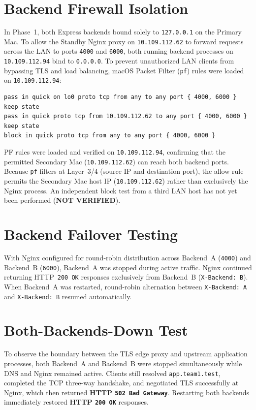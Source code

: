 \documentclass[conference]{IEEEtran}
\begin{document}
\section{Backend Firewall Isolation}
In Phase~1, both Express backends bound solely to \texttt{127.0.0.1} on the Primary Mac. To allow the Standby Nginx proxy on \texttt{10.109.112.62} to forward requests across the LAN to ports \texttt{4000} and \texttt{6000}, both running backend processes on \texttt{10.109.112.94} bind to \texttt{0.0.0.0}. To prevent unauthorized LAN clients from bypassing TLS and load balancing, macOS Packet Filter (\texttt{pf}) rules were loaded on \texttt{10.109.112.94}:

\begin{lstlisting}[caption={macOS PF Anchor Rules (\texttt{configs/pf/cn\_project.anchor.conf})}]
pass in quick on lo0 proto tcp from any to any port { 4000, 6000 } keep state
pass in quick proto tcp from 10.109.112.62 to any port { 4000, 6000 } keep state
block in quick proto tcp from any to any port { 4000, 6000 }
\end{lstlisting}

PF rules were loaded and verified on \texttt{10.109.112.94}, confirming that the permitted Secondary Mac (\texttt{10.109.112.62}) can reach both backend ports. Because \texttt{pf} filters at Layer~3/4 (source IP and destination port), the allow rule permits the Secondary Mac host IP (\texttt{10.109.112.62}) rather than exclusively the Nginx process. An independent block test from a third LAN host has not yet been performed (\textbf{NOT VERIFIED}).

\section{Backend Failover Testing}
With Nginx configured for round-robin distribution across Backend~A (\texttt{4000}) and Backend~B (\texttt{6000}), Backend~A was stopped during active traffic. Nginx continued returning HTTP~\texttt{200 OK} responses exclusively from Backend~B (\texttt{X-Backend: B}). When Backend~A was restarted, round-robin alternation between \texttt{X-Backend: A} and \texttt{X-Backend: B} resumed automatically.

\section{Both-Backends-Down Test}
To observe the boundary between the TLS edge proxy and upstream application processes, both Backend~A and Backend~B were stopped simultaneously while DNS and Nginx remained active. Clients still resolved \texttt{app.team1.test}, completed the TCP three-way handshake, and negotiated TLS successfully at Nginx, which then returned \textbf{HTTP \texttt{502 Bad Gateway}}. Restarting both backends immediately restored \textbf{HTTP \texttt{200 OK}} responses.
\end{document}
